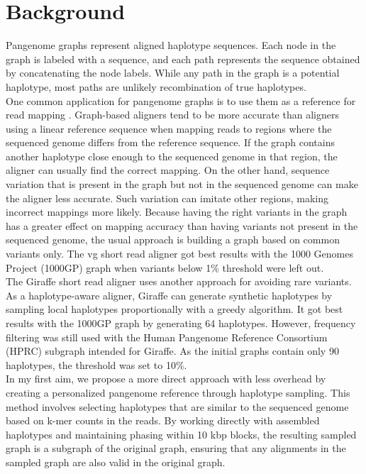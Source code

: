 \documentclass[11pt]{ucthesis}
\begin{document}
\section{Background}
Pangenome graphs \cite{eizenga2020pangenome} represent aligned haplotype sequences. Each node in the graph is labeled with a sequence, and each path represents the sequence obtained by concatenating the node labels.
While any path in the graph is a potential haplotype, most paths are unlikely recombination of true haplotypes. \\ 
One common application for pangenome graphs is to use them as a reference for read mapping \cite{rautiainen2020graphaligner,siren2021pangenomics,garrison2018variation}. Graph-based aligners tend to be more accurate than aligners using a linear reference sequence when
mapping reads to regions where the sequenced genome differs from the reference sequence. If the graph contains another haplotype close enough to the sequenced genome in that region, the aligner
can usually find the correct mapping. On the other hand, sequence variation that is present in the graph but not in the sequenced genome can make the aligner less accurate. Such variation can
imitate other regions, making incorrect mappings more likely.
Because having the right variants in the graph has a greater effect on mapping accuracy than having variants not present in the sequenced genome, the usual approach is building a graph based
on common variants only. The vg short read aligner got best results with the 1000 Genomes Project (1000GP) \cite{10002015global} graph when variants below 1\% threshold were left out.\\
The Giraffe short read aligner \cite{siren2021pangenomics} uses another approach for avoiding rare variants. As a haplotype-aware aligner, Giraffe can generate synthetic haplotypes by sampling local haplotypes proportionally with a greedy algorithm. It got best results with the 1000GP graph by generating 64 haplotypes. However, frequency filtering was still used with the Human Pangenome Reference Consortium (HPRC) subgraph intended for Giraffe. As the initial graphs contain only 90
haplotypes, the threshold was set to 10\%.\\
In my first aim, we propose a more direct approach with less overhead by creating a personalized pangenome reference through haplotype sampling. This method involves selecting haplotypes that are similar to the sequenced genome based on k-mer counts in the reads. By working directly with assembled haplotypes and maintaining phasing within 10 kbp blocks, the resulting sampled graph is a subgraph of the original graph, ensuring that any alignments in the sampled graph are also valid in the original graph.
\end{document}
